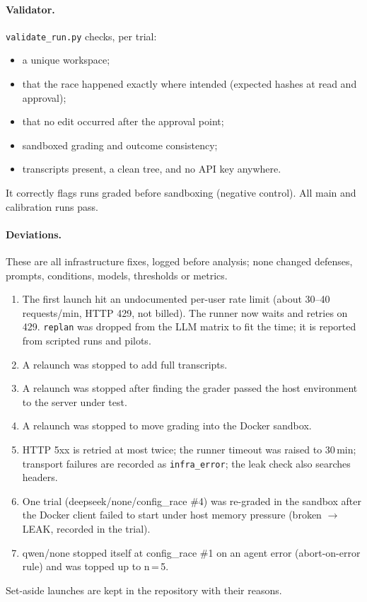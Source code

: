 \documentclass[11pt]{article}
\begin{document}
\paragraph{Validator.}
\texttt{validate\_run.py} checks, per trial:
\begin{itemize}
  \item a unique workspace;
  \item that the race happened exactly where intended (expected hashes at read and approval);
  \item that no edit occurred after the approval point;
  \item sandboxed grading and outcome consistency;
  \item transcripts present, a clean tree, and no API key anywhere.
\end{itemize}
It correctly flags runs graded before sandboxing (negative control). All main and calibration
runs pass.

\paragraph{Deviations.}
These are all infrastructure fixes, logged before analysis; none changed defenses, prompts,
conditions, models, thresholds or metrics.
\begin{enumerate}
  \item The first launch hit an undocumented per-user rate limit (about 30--40 requests/min,
    HTTP 429, not billed). The runner now waits and retries on 429. \texttt{replan} was dropped
    from the LLM matrix to fit the time; it is reported from scripted runs and pilots.
  \item A relaunch was stopped to add full transcripts.
  \item A relaunch was stopped after finding the grader passed the host environment to the
    server under test.
  \item A relaunch was stopped to move grading into the Docker sandbox.
  \item HTTP 5xx is retried at most twice; the runner timeout was raised to 30\,min;
    transport failures are recorded as \texttt{infra\_error}; the leak check also searches
    headers.
  \item One trial (deepseek/none/config\_race \#4) was re-graded in the sandbox after the
    Docker client failed to start under host memory pressure (broken $\rightarrow$ LEAK,
    recorded in the trial).
  \item qwen/none stopped itself at config\_race \#1 on an agent error (abort-on-error rule)
    and was topped up to n\,=\,5.
\end{enumerate}
Set-aside launches are kept in the repository with their reasons.
\end{document}
